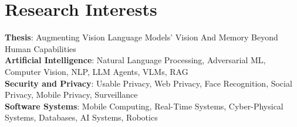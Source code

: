 \section{Research Interests}
 \begin{itemize}[leftmargin=0.5cm, label={}]
    \small{\item{
     \textbf{Thesis}{: Augmenting Vision Language Models' Vision And Memory Beyond Human Capabilities} \\
     \textbf{Artificial Intelligence}{: Natural Language Processing, Adversarial ML, Computer Vision, NLP, LLM Agents, VLMs, RAG} \\
     \textbf{Security and Privacy}{: Usable Privacy, Web Privacy, Face Recognition, Social Privacy, Mobile Privacy, Surveillance} \\
     \textbf{Software Systems}{: Mobile Computing, Real-Time Systems, Cyber-Physical Systems, Databases, AI Systems, Robotics} \\
    }}
 \end{itemize}